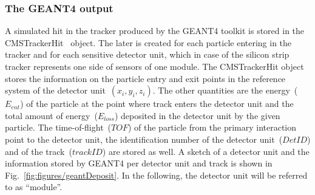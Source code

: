 




\subsubsection{The GEANT4 output~\label{sec:G4out}}

A simulated hit in the tracker produced by the GEANT4 toolkit is stored in the CMSTrackerHit~\cite{Lefebure:1364020} object. The later is created for each particle entering in the tracker and for each sensitive detector unit, which in case of the silicon strip tracker represents one side of sensors of one module. The CMSTrackerHit object stores the information on the particle entry and exit points in the reference system of the detector unit~$(x_{i}, y_{i}, z_{i})$. The other quantities are the energy~($E_{ent}$) of the particle at the point where track enters the detector unit and the total amount of energy~($E_{loss}$) deposited in the detector unit by the given particle. The time-of-flight~($TOF$) of the particle from the primary interaction point to the detector unit, the identification number of the detector unit~($DetID$) and of the track~($trackID$) are stored as well. A sketch of a detector unit and the information stored by GEANT4 per detector unit and track is shown in Fig.~\ref{fig:figures/geantDeposit}. In the following, the detector unit will be referred to as ``module''.

